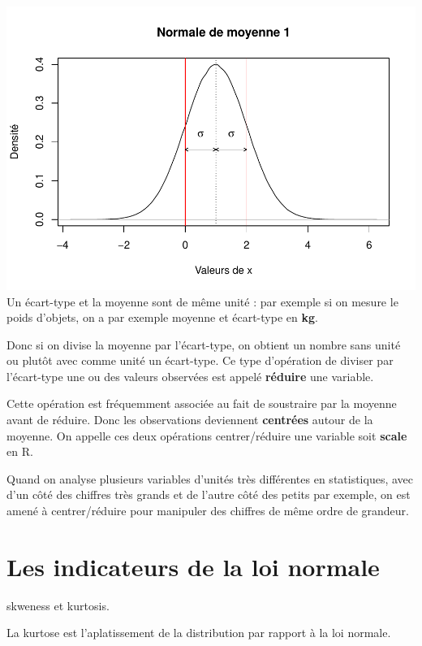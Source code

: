 \documentclass[
]{book}
\begin{document}
\includegraphics{_main_files/figure-latex/unnamed-chunk-8-1.pdf}
Un écart-type et la moyenne sont de même unité : par exemple si on mesure le poids
d'objets, on a par exemple moyenne et écart-type en \textbf{kg}.

Donc si on divise la moyenne par l'écart-type, on obtient un nombre sans unité ou
plutôt avec comme unité un écart-type. Ce type d'opération de diviser par l'écart-type
une ou des valeurs observées est appelé \textbf{réduire} une variable.

Cette opération est fréquemment associée au fait de soustraire par la moyenne avant
de réduire. Donc les observations deviennent \textbf{centrées} autour de la moyenne. On
appelle ces deux opérations centrer/réduire une variable soit \textbf{scale} en R.

Quand on analyse plusieurs variables d'unités très différentes en statistiques,
avec d'un côté des chiffres très grands et de l'autre côté des petits par
exemple, on est amené à centrer/réduire pour manipuler des chiffres de même
ordre de grandeur.

\hypertarget{les-indicateurs-de-la-loi-normale}{%
\section{Les indicateurs de la loi normale}\label{les-indicateurs-de-la-loi-normale}}

skweness et kurtosis.

La kurtose est l'aplatissement de la distribution par rapport à la loi normale.
\end{document}

